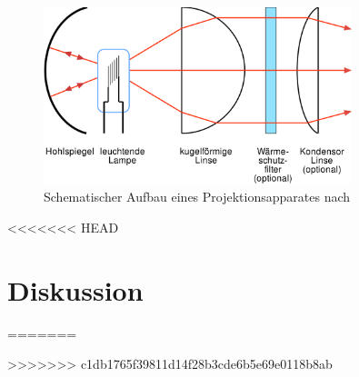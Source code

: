 \documentclass[11pt, a4paper]{article}
\begin{document}
    \begin{figure}[h]
        \centering
        \includegraphics[width=0.8\textwidth]{Condensor-1-de.svg.png}
        \caption{Schematischer Aufbau eines Projektionsapparates nach \cite{projektionsapparat}}
        \label{fig:projektionsapparat}
    \end{figure}



<<<<<<< HEAD
    \section{Diskussion}
=======

>>>>>>> c1db1765f39811d14f28b3cde6b5e69e0118b8ab


    
    
\end{document}
